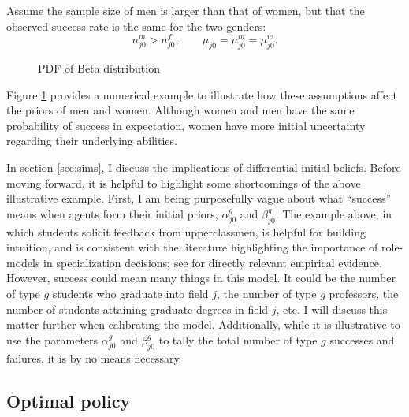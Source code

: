\documentclass[11 pt]{article}
\newcommand{\toedit}[1]{{\color{gray}#1}}
\newcommand{\toedit}[1]{#1}
\newcommand{\footnts}[1]{\nts{\footnote{\nts{#1}}}}
\newcommand{\footnts}[1]{}
\newcommand{\pr}[1]{\left( #1 \right)}
\begin{document}
Assume the sample size of men is larger than that of women, but that the observed success rate is the same for the two genders:
\begin{equation*}
  n_{j0}^m > n_{j0}^f, \quad \quad \mu_{j0} = \mu_{j0}^m = \mu_{j0}^w.
\end{equation*}
\begin{figure}
\centering

\caption{PDF of Beta distribution}
\label{beta_distribution}
\end{figure}
Figure \ref{beta_distribution} provides a numerical example to illustrate how these assumptions affect the priors of men and women. 
Although women and men have the same probability of success in expectation, women have more initial uncertainty regarding their underlying abilities. 

In section \ref{sec:sims}, I discuss the implications of differential initial beliefs.
Before moving forward, it is helpful to highlight some shortcomings of the above illustrative example.
First, I am being purposefully vague about what ``success'' means when agents form their initial priors, $\alpha_{j0}^g$ and $\beta_{j0}^g$.
The example above, in which students solicit feedback from upperclassmen, is helpful for building intuition, and is consistent with the literature highlighting the importance of role-models in specialization decisions; see \textcite{PS20} for directly relevant empirical evidence.
However, success could mean many things in this model. 
It could be the number of type $g$ students who graduate into field $j$, the number of type $g$ professors, the number of students attaining graduate degrees in field $j$, etc. 
I will discuss this matter further when calibrating the model.\footnts{Make sure I do this!}
\toedit{Additionally, while it is illustrative to use the parameters $\alpha_{j0}^g$ and $\beta_{j0}^g$ to tally the total number of type $g$ successes and failures, it is by no means necessary.}


\subsection{Optimal policy}\label{sec:optimal_policy}
\end{document}
